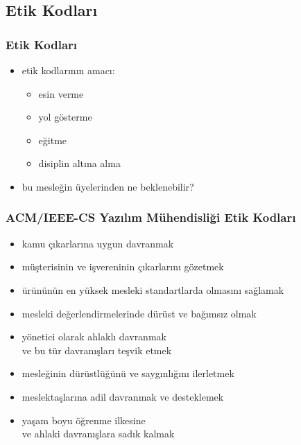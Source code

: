 \documentclass[dvipsnames]{beamer}
\theoremstyle{definition}
\theoremstyle{example}
\theoremstyle{plain}
\begin{document}
\subsection{Etik Kodları}

\begin{frame}
  \frametitle{Etik Kodları}

  \begin{itemize}
    \item etik kodlarının amacı:

    \begin{itemize}
      \item esin verme
      \item yol gösterme
      \item eğitme
      \item disiplin altına alma
    \end{itemize}

    \pause
    \item bu mesleğin üyelerinden ne beklenebilir?
  \end{itemize}
\end{frame}


\begin{frame}
  \frametitle{ACM/IEEE-CS Yazılım Mühendisliği Etik Kodları}

  \begin{itemize}
    \item kamu çıkarlarına uygun davranmak
    \item müşterisinin ve işvereninin çıkarlarını gözetmek
    \item ürününün en yüksek mesleki standartlarda olmasını sağlamak
    \item mesleki değerlendirmelerinde dürüst ve bağımsız olmak
    \item yönetici olarak ahlaklı davranmak\\
      ve bu tür davranışları teşvik etmek
    \item mesleğinin dürüstlüğünü ve saygınlığını ilerletmek
    \item meslektaşlarına adil davranmak ve desteklemek
    \item yaşam boyu öğrenme ilkesine\\
      ve ahlaki davranışlara sadık kalmak
  \end{itemize}
\end{frame}
\end{document}

